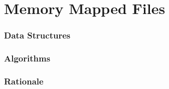 \part{Memory Mapped Files}

\section{Data Structures}


\section{Algorithms}



\section{Rationale}

